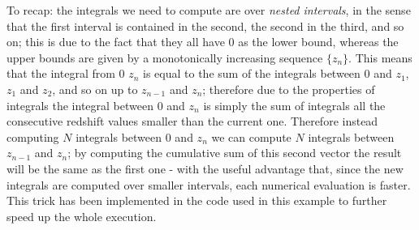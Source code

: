 To recap: the integrals we need to compute are over \emph{nested intervals}, in the sense that the first interval is contained in the second, the second in the third, and so on; this is due to the fact that they all have 0 as the lower bound, whereas the upper bounds are given by a monotonically increasing sequence $\{z_n\}$. This means that the integral from 0 $z_n$ is equal to the sum of the integrals between 0 and $z_1$, $z_1$ and $z_2$, and so on up to $z_{n-1}$ and $z_n$; therefore due to the properties of integrals the integral between 0 and $z_n$ is simply the sum of integrals all the consecutive redshift values smaller than the current one. Therefore instead computing $N$ integrals between $0$ and $z_n$ we can compute $N$ integrals between $z_{n-1}$ and $z_n$; by computing the cumulative sum of this second vector the result will be the same as the first one - with the useful advantage that, since the new integrals are computed over smaller intervals, each numerical evaluation is faster.
This trick has been implemented in the code used in this example to further speed up the whole execution.


